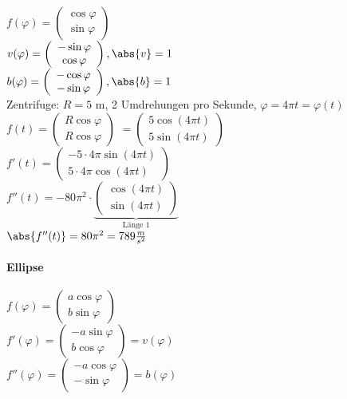 $f(\varphi) = \left( \begin{array}{c} \cos \varphi\\ \sin \varphi \end{array}\right)$\\
$v(\varphi) = \left( \begin{array}{c} -\sin \varphi\\ \cos \varphi \end{array}\right), \abs{v}=1 $\\
$b(\varphi)= \left( \begin{array}{c} -\cos \varphi\\ -\sin \varphi \end{array}\right), \abs{b}=1$\\
Zentrifuge: $R=5$ m, 2 Umdrehungen pro Sekunde, $\varphi=4\pi t = \varphi(t)$\\
$f(t)=\left( \begin{array}{c} R\cos \varphi\\ R\cos \varphi \end{array}\right) $
$= \left( \begin{array}{c} 5 \cos(4\pi t)\\ 5 \sin(4\pi t)\end{array}\right)$\\
$f'(t) = \left( \begin{array}{c} -5\cdot 4\pi \sin(4\pi t)\\ 5\cdot 4 \pi \cos(4\pi t) \end{array}\right)$\\
$f''(t) = -80\pi^2 \cdot \underbrace{\left( \begin{array}{c} \cos(4\pi t)\\ \sin(4\pi t) \end{array}\right)}_{\textrm{Länge 1}}$\\
$\abs{f''(t)}=80\pi^2 = 789 \frac{m}{s^2}$
\paragraph{Ellipse}
$ f(\varphi)=\left( \begin{array}{c} a \cos \varphi \\ b \sin \varphi \end{array}\right)$\\
$ f'(\varphi)= \left( \begin{array}{c} -a \sin \varphi\\ b \cos \varphi\end{array}\right)=v(\varphi)$\\
$ f''(\varphi)= \left( \begin{array}{c} -a \cos \varphi\\ - \sin \varphi\end{array}\right)=b(\varphi)$

